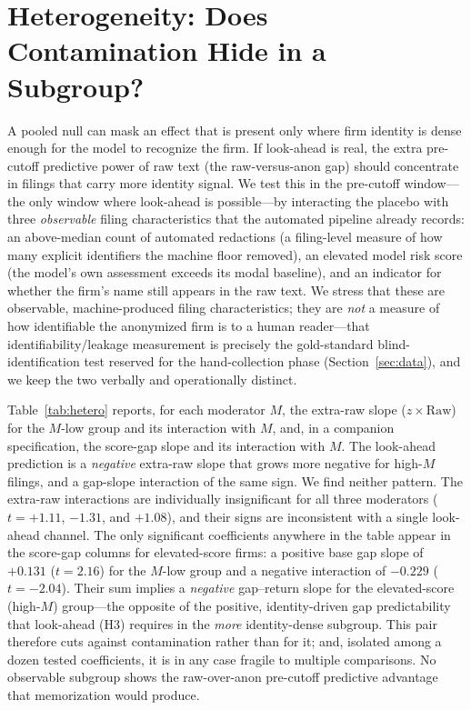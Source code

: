 \documentclass[12pt]{article}
\begin{document}
\section{Heterogeneity: Does Contamination Hide in a Subgroup?}\label{sec:het}
A pooled null can mask an effect that is present only where firm identity is dense enough for
the model to recognize the firm. If look-ahead is real, the extra pre-cutoff predictive power
of raw text (the raw-versus-anon gap) should concentrate in filings that carry more identity
signal. We test this in the pre-cutoff window---the only window where look-ahead is
possible---by interacting the placebo with three \emph{observable} filing characteristics
that the automated pipeline already records: an above-median count of automated redactions
(a filing-level measure of how many explicit identifiers the machine floor removed), an
elevated model risk score (the model's own assessment exceeds its modal baseline), and an
indicator for whether the firm's name still appears in the raw text. We stress that these are
observable, machine-produced filing characteristics; they are \emph{not} a measure of how
identifiable the anonymized firm is to a human reader---that identifiability/leakage
measurement is precisely the gold-standard blind-identification test reserved for the
hand-collection phase (Section~\ref{sec:data}), and we keep the two verbally and operationally
distinct.

Table~\ref{tab:hetero} reports, for each moderator $M$, the extra-raw slope
($z\times\text{Raw}$) for the $M$-low group and its interaction with $M$, and, in a companion
specification, the score-gap slope and its interaction with $M$. The look-ahead prediction is
a \emph{negative} extra-raw slope that grows more negative for high-$M$ filings, and a
gap-slope interaction of the same sign. We find neither pattern. The extra-raw interactions
are individually insignificant for all three moderators ($t=+1.11$, $-1.31$, and $+1.08$),
and their signs are inconsistent with a single look-ahead channel. The only significant
coefficients anywhere in the table appear in the score-gap columns for elevated-score firms: a
positive base gap slope of $+0.131$ ($t=2.16$) for the $M$-low group and a negative
interaction of $-0.229$ ($t=-2.04$). Their sum implies a \emph{negative} gap--return slope for
the elevated-score (high-$M$) group---the opposite of the positive, identity-driven gap
predictability that look-ahead (H3) requires in the \emph{more} identity-dense subgroup. This
pair therefore cuts against contamination rather than for it; and, isolated among a dozen
tested coefficients, it is in any case fragile to multiple comparisons. No observable subgroup
shows the raw-over-anon pre-cutoff predictive advantage that memorization would produce.
\end{document}
